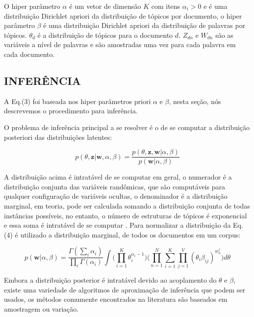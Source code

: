 \documentclass[12pt,a4paper]{article}
\begin{document}
  O hiper parâmetro $\alpha$ é um vetor de dimensão $K$ com itens \(\alpha _i>0\) e é uma distribuição Dirichlet apriori da distribuição de tópicos por documento,
  o hiper parâmetro $\beta$ é uma distribuição Dirichlet apriori da distribuição de palavras por tópicos. $\theta _d$ é a distribuição de tópicos para o documento $d$. $Z_{dn}$ e $W_{dn}$ são as variáveis a nível de palavras e são amostradas uma vez para cada palavra em cada documento.
  
  
  \subsection{INFERÊNCIA}
  A Eq.(3) foi baseada nos hiper parâmetros priori $\alpha$ e $\beta$, nesta seção, nós descrevemos o procedimento para inferência.
  
  O problema de inferência principal a se resolver é o de se computar a distribuição posteriori das distribuições latentes:
  
  \begin{equation}
  p(\theta,\textbf{z}|\textbf{w},\alpha,\beta) = \frac{p(\theta,\textbf{z},\textbf{w}|\alpha,\beta)}{p(\textbf{w}|\alpha,\beta)}
  \end{equation}
  
  A distribuição acima é intratável de se computar em geral, o numerador é a distribuição conjunta das variáveis randômicas, que são computáveis para qualquer configuração de variáveis ocultas,
   o denominador é a distribuição marginal, em teoria, pode ser calculada somando a distribuição conjunta de todas instâncias possíveis, no entanto,
   o número de estruturas de tópicos é exponencial e essa soma é intratável de se computar \cite{blei2012probabilistic}. Para normalizar a distribuição da Eq.(4) é utilizado a distribuição marginal,
   de todos os documentos em um corpus:
  
  \begin{equation}
  p(\textbf{w}|\alpha,\beta)=\frac{\Gamma(\sum_{i}\alpha_i)}{\prod_{i}\Gamma(\alpha_i)}\int{\Bigg(\prod_{i=1}^{K}\theta_i^{\alpha_i-1}\Bigg)} \Bigg(\prod_{n=1}^{N}\sum_{i=1}^{K}\prod_{j=1}^{V}(\theta_i\beta_{ij})^{w_n^j}\Bigg)d\theta
  \end{equation}
  
  Embora a distribuição posterior é intratável devido ao acoplamento do $\theta$ e $\beta$, existe uma variedade de algoritmos de aproximação de inferência que podem ser usados,
   os métodos comumente encontrados na literatura são baseados em amostragem ou variação.
  
\end{document}

